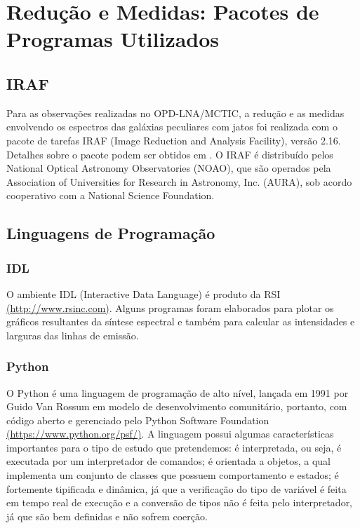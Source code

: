 \chapter{Redução e Medidas: Pacotes de Programas Utilizados}

\section{IRAF}

Para as observações realizadas no OPD-LNA/MCTIC, a redução e as medidas envolvendo os espectros das galáxias peculiares com jatos foi realizada com o pacote de tarefas IRAF (Image Reduction and Analysis Facility), versão 2.16. Detalhes sobre o pacote podem ser obtidos em \cite{tody1993iraf}. O IRAF é distribuído pelos National Optical Astronomy Observatories (NOAO), que são operados pela Association of Universities for Research in Astronomy, Inc. (AURA), sob acordo cooperativo com a National Science Foundation.


\section{Linguagens de Programação}

\subsection{IDL}

O ambiente IDL (Interactive Data Language) é produto da RSI \url{(http://www.rsinc.com)}. Alguns programas foram elaborados para plotar os gráficos resultantes da síntese espectral e também para calcular as intensidades e larguras das linhas de emissão.

\subsection{Python}

O Python é uma linguagem de programação de alto nível, lançada em 1991 por Guido Van Rossum em modelo de desenvolvimento comunitário, portanto, com código aberto e gerenciado pelo Python Software Foundation \url{(https://www.python.org/psf/)}. A linguagem possui algumas características importantes para o tipo de estudo que pretendemos: é interpretada, ou seja, é
executada por um interpretador de comandos; é orientada a objetos, a qual implementa um conjunto de classes que possuem comportamento e estados; é fortemente tipificada e dinâmica, já que a verificação do tipo de variável é feita em tempo real de execução e a conversão de tipos não é feita pelo interpretador, já que são bem definidas e não sofrem coerção.

